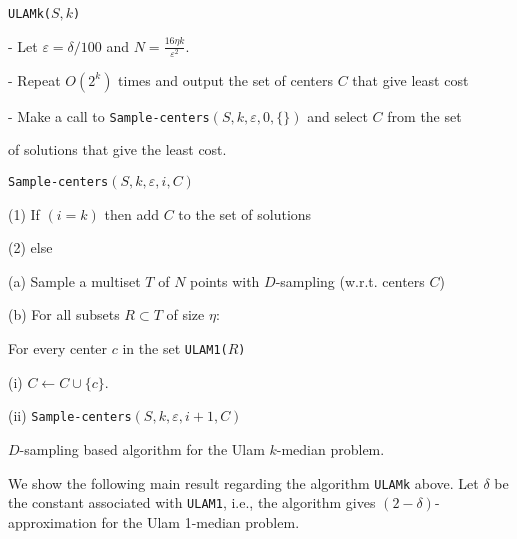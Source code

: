 \documentclass[11pt]{llncs}
\newcommand{\veps}{\varepsilon}
\begin{document}
\begin{center}
\begin{Algorithm}[h]
\begin{boxedminipage}{5.8in}
{\tt ULAMk($S, k$)}

\hspace{0.1in} - Let $\veps = \delta/100$ and $N = \frac{16 \eta k}{\veps^2}$.

\hspace{0.1in} - Repeat $O(2^k)$ times and output the set of centers $C$ that give least cost

\hspace{0.3in} - Make a call to {\tt Sample-centers$(S, k, \veps, 0, \{\})$} and select $C$ from the set  

\hspace{0.4in} of solutions that give the least cost.

\vspace{0.1in}

{\tt Sample-centers$(S, k, \veps, i, C)$}

\hspace{0.1in} (1) If $(i = k)$ then add $C$ to the set of solutions

\hspace{0.1in} (2) else

\hspace{0.3in} (a) Sample a multiset $T$ of $N$ points with $D$-sampling (w.r.t. centers $C$)

\hspace{0.3in} (b) For all subsets $R \subset T$ of size $\eta$:

\hspace{0.7in} For every center $c$ in the set {\tt ULAM1($R$)}

\hspace{0.9in} (i) $C \leftarrow C \cup \{c\}$.

\hspace{0.9in} (ii) {\tt Sample-centers$(S, k, \veps, i+1, C)$}
\end{boxedminipage}
\caption{$D$-sampling based algorithm for the Ulam $k$-median problem.}
\label{fig:k}
\end{Algorithm}
\end{center}
We show the following main result regarding the algorithm {\tt ULAMk} above. Let $\delta$ be the constant associated with {\tt ULAM1}, i.e., the algorithm gives $(2-\delta)$-approximation for the Ulam 1-median problem.
\end{document}
